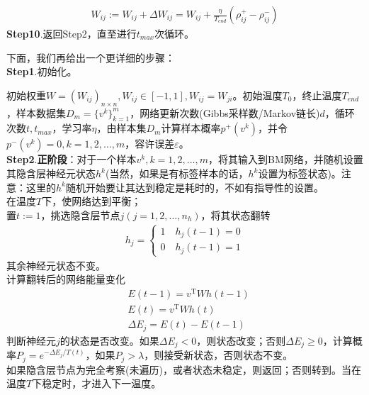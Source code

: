 {\begin{align*}
            W_{ij}:=W_{ij} + \Delta W_{ij} = W_{ij} + \frac{\eta}{T_{end}}(\rho_{ij}^+ - \rho_{ij}^-)
            \end{align*}
            \textbf{Step10}.返回Step2，直至进行$t_{max}$次循环。
            \par
            下面，我们再给出一个更详细的步骤：\\
            \textbf{Step1}.初始化。
            \par
            初始权重$W=(W_{ij})_{n\times n},W_{ij}\in [-1,1],W_{ij} = W_{ji}$。初始温度$T_0$，终止温度$T_{end}$，样本数据集$D_m = \{v^k\}_{k=1}^m$，网络更新次数(Gibbs采样数/Markov链长)$d$，循环次数$t,t_{max}$，学习率$\eta$，由样本集$D_m$计算样本概率$p^+(v^k)$，并令$p^-(v^k) = 0,k=1,2,\dots,m$，容许误差$\varepsilon$。\\
            \textbf{Step2}.\textbf{正阶段}：对于一个样本$v^k,k=1,2,\dots,m$，将其输入到BM网络，并随机设置其隐含层神经元状态$h^k$(当然，如果是有标签样本的话，$h^k$设置为标签状态)。注意：这里的$h^k$随机开始要让其达到稳定是耗时的，不如有指导性的设置。\\
            在温度$T$下，使网络达到平衡；\\
            置$t:=1$，挑选隐含层节点$j(j=1,2,\dots,n_h)$，将其状态翻转
            \begin{align*}
            h_j=
            \left\{
            \begin{aligned}
            1\quad h_j(t-1) = 0\\
            0\quad h_j(t-1) = 1
            \end{aligned}
            \right.
            \end{align*}
            其余神经元状态不变。\\
            计算翻转后的网络能量变化
            \begin{align*}
            & E(t-1) = v^\mathrm{T}Wh(t-1)\\
            & E(t) = v^\mathrm{T}Wh(t)\\
            & \Delta E_j = E(t)-E(t-1)
            \end{align*}
            判断神经元$j$的状态是否改变。如果$\Delta E_j<0$，则状态改变；否则$\Delta E_j \geqslant 0$，计算概率$P_j = e^{-\Delta E_j/T(t)}$，如果$P_j >\lambda$，则接受新状态，否则状态不变。\\
            如果隐含层节点为完全考察(未遍历)，或者状态未稳定，则返回；否则转到。当在温度$T$下稳定时，才进入下一温度。\\
}
